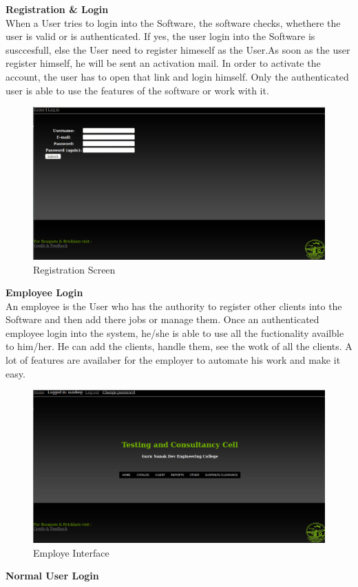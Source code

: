 \newpage 
{\bf Registration \& Login}\\

When a User tries to login into the Software, the software checks, whethere the user is valid or is authenticated. If yes, the user login into the Software is susccesfull, else the User need to register himeself as the User.As soon as the user register himself, he will be sent an activation mail. In order to activate the account, the user has to open that link and login himself. Only the authenticated user is able to use the features of the software or work with it.
\begin{figure}[h]
\vskip 2cm
\centering \includegraphics[scale=1.0]{register1.png}
\caption{Registration Screen}
\end{figure}

\newpage
{\bf Employee Login}\\
 
An employee is the User who has the authority to register other clients into the Software and then add there jobs or manage them. Once an authenticated employee login into the system, he/she is able to use all the fuctionality availble to him/her. He can add the clients, handle them, see the wotk of all the clients. A lot of features are availaber for the employer to automate his work and make it easy.
\begin{figure}[h]
\vskip 2cm
\centering \includegraphics[scale=1.0]{user1.png}
\caption{Employe Interface}
\end{figure}
\newpage
{\bf Normal User Login}\\

